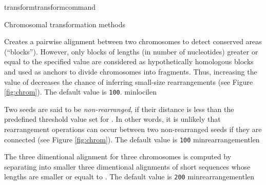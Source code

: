 \begin{command}{transform}{transformcommand}
\begin{arguments}
\begin{argumentgroup}{Chromosomal transformation methods}
\begin{description}
                          {Creates a pairwise alignment between two chromosomes to
                          detect conserved areas (``blocks''). However, only blocks of
                          lengths (in number of nucleotides) greater or equal to the specified 
                          value are considered as hypothetically
                          homologous blocks and used as anchors to divide chromosomes into
                          fragments. Thus, increasing the value of  decreases
                           the chance of inferring small-size rearrangements (see Figure \ref{fig:chrom}). 
                           The default value is \texttt{100}.} 
                           {minlocilen}
                           
                            {Two seeds are said to be \emph{non-rearranged}, 
               	           if their distance is less than the predefined threshold value set
	                    for .  In other words, it is unlikely 
	                    that rearrangement operations can occur between two non-rearranged seeds
	                    if they are connected (see Figure \ref{fig:chrom}).
	                    The default value is \texttt{100}}
                             {minrearrangementlen}


                            {The three dimentional alignment for three chromosomes
                            is computed by separating into smaller three dimentional
                            alignments of short sequences whose lengths are smaller 
                            or equalt to . The default value
                             is \texttt{200}}
                             {minrearrangementlen}


\end{description}
\end{argumentgroup}
\end{arguments}
\end{command}
